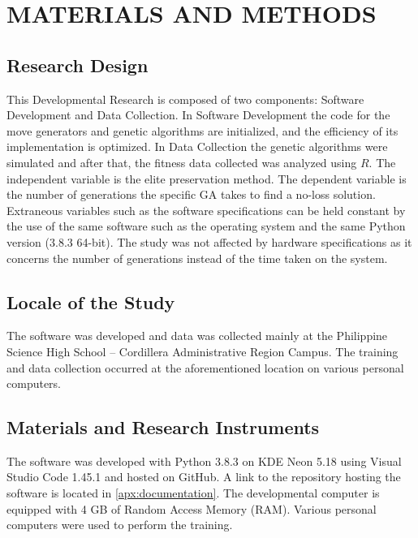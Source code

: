 \documentclass{strrespaper-trad}
\begin{document}
	\chapter{MATERIALS AND METHODS}
		\section{Research Design}
			This Developmental Research is composed of two components: Software Development and Data Collection.
			In Software Development the code for the move generators and genetic algorithms are initialized, and the efficiency of its implementation is optimized.
			In Data Collection the genetic algorithms were simulated and after that, the fitness data collected was analyzed using $R$.
			The independent variable is the elite preservation method.
			The dependent variable is the number of generations the specific GA takes to find a no-loss solution.
			Extraneous variables such as the software specifications can be held constant by the use of the same software such as the operating system and the same Python version (3.8.3 64-bit).
			The study was not affected by hardware specifications as it concerns the number of generations instead of the time taken on the system.

		\section{Locale of the Study}
			The software was developed and data was collected mainly at the Philippine Science High School -- Cordillera Administrative Region Campus.
			The training and data collection occurred at the aforementioned location on various personal computers.

		\section{Materials and Research Instruments}
			The software was developed with Python 3.8.3 on KDE Neon 5.18 using Visual Studio Code 1.45.1 and hosted on GitHub.
			A link to the repository hosting the software is located in \ref{apx:documentation}.
			The developmental computer is equipped with 4 GB of Random Access Memory (RAM).
			Various personal computers were used to perform the training.
\end{document}

